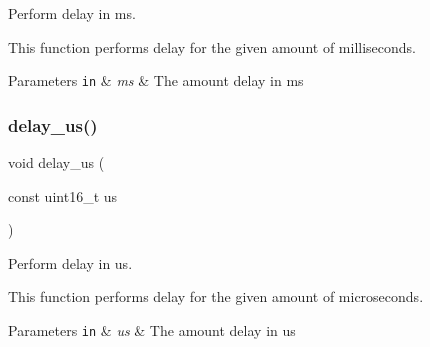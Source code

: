 Perform delay in ms. 

This function performs delay for the given amount of milliseconds.


\begin{DoxyParams}[1]{Parameters}
\mbox{\tt in}  & {\em ms} & The amount delay in ms \\
\hline
\end{DoxyParams}
\mbox{\label{group__doc__driver__hal__delay_gaa17c6e82a9085391c696904957505621}} 
\subsubsection{\texorpdfstring{delay\+\_\+us()}{delay\_us()}}
{\footnotesize\ttfamily void delay\+\_\+us (\begin{DoxyParamCaption}\item[{const uint16\+\_\+t}]{us }\end{DoxyParamCaption})}



Perform delay in us. 

This function performs delay for the given amount of microseconds.


\begin{DoxyParams}[1]{Parameters}
\mbox{\tt in}  & {\em us} & The amount delay in us \\
\hline
\end{DoxyParams}
